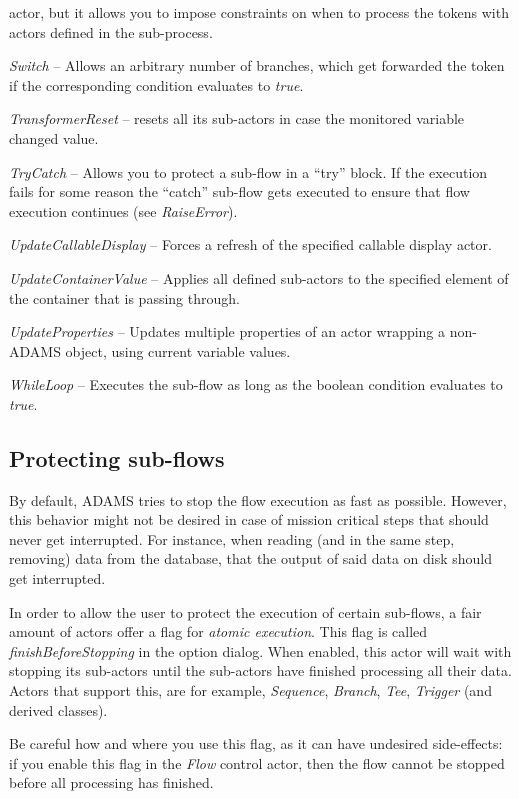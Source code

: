 \begin{tight_itemize}
	actor, but it allows you to impose constraints on when to process the tokens
	with actors defined in the sub-process.
	\item \textit{Switch} -- Allows an arbitrary number of branches, which get
	forwarded the token if the corresponding condition evaluates to \textit{true}.
	\item \textit{TransformerReset} -- resets all its sub-actors in case the monitored
	variable changed value.
	\item \textit{TryCatch} -- Allows you to protect a sub-flow in a ``try''
	block. If the execution fails for some reason the ``catch'' sub-flow gets
	executed to ensure that flow execution continues (see \textit{RaiseError}).
	\item \textit{UpdateCallableDisplay} -- Forces a refresh of the specified
	callable display actor.
	\item \textit{UpdateContainerValue} -- Applies all defined sub-actors to the
	specified element of the container that is passing through.
	\item \textit{UpdateProperties} -- Updates multiple properties of an actor
	wrapping a non-ADAMS object, using current variable values.
	\item \textit{WhileLoop} -- Executes the sub-flow as long as the boolean
	condition evaluates to \textit{true}.
\end{tight_itemize}

\subsection{Protecting sub-flows}
By default, ADAMS tries to stop the flow execution as fast as possible. However,
this behavior might not be desired in case of mission critical steps that should
never get interrupted. For instance, when reading (and in the same step, removing)
data from the database, that the output of said data on disk should get 
interrupted. 

In order to allow the user to protect the execution of certain 
sub-flows, a fair amount of actors offer a flag for \textit{atomic execution}.
This flag is called \textit{finishBeforeStopping} in the option dialog. When 
enabled, this actor will wait with stopping its sub-actors until the sub-actors
have finished processing all their data. Actors that support this, are for 
example, \textit{Sequence}, \textit{Branch}, \textit{Tee}, \textit{Trigger} 
(and derived classes).

Be careful how and where you use this flag, as it can have undesired 
side-effects: if you enable this flag in the \textit{Flow} control actor, then 
the flow cannot be stopped before all processing has finished.

